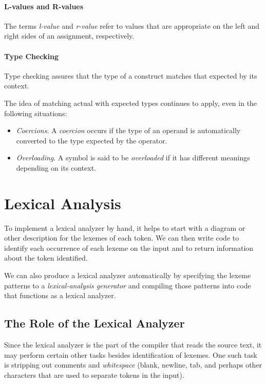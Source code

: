 \documentclass[12pt,a4paper,twoside,openany]{book}
\begin{document}
\subsubsection{L-values and R-values}

The terms \textit{l-value} and \textit{r-value} refer to values that are appropriate on the left and right sides of an assignment, respectively.

\subsubsection{Type Checking}

Type checking assures that the type of a construct matches that expected by its context.

The idea of matching actual with expected types continues to apply, even in the following situations:
\begin{itemize}
    \item\textit{Coercions}. A \textit{coercion} occurs if the type of an operand is automatically converted to the type expected by the operator.
    \item\textit{Overloading}. A symbol is said to be \textit{overloaded} if it has different meanings depending on its context.
\end{itemize}

\chapter{Lexical Analysis}

To implement a lexical analyzer by hand, it helps to start with a diagram or other description for the lexemes of each token. We can then write code to identify each occurrence of each lexeme on the input and to return information about the token identified.

We can also produce a lexical analyzer automatically by specifying the lexeme patterns to a \textit{lexical-analysis generator} and compiling those patterns into code that functions as a lexical analyzer.

\section{The Role of the Lexical Analyzer}

Since the lexical analyzer is the part of the compiler that reads the source text, it may perform certain other tasks besides identification of lexemes. One such task is stripping out comments and \textit{whitespace} (blank, newline, tab, and perhaps other characters that are used to separate tokens in the input).
\end{document}
